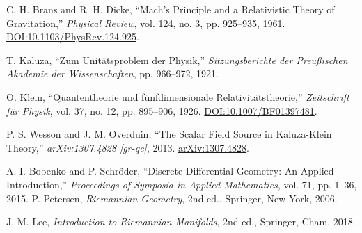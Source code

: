 \documentclass[twoside,twocolumn]{article}
\numberwithin{equation}{section} %
\begin{document}
\begin{thebibliography}{99}
C. H. Brans and R. H. Dicke,
``Mach's Principle and a Relativistic Theory of Gravitation,''
\textit{Physical Review}, vol. 124, no. 3, pp. 925--935, 1961.
\href{https://doi.org/10.1103/PhysRev.124.925}{DOI:10.1103/PhysRev.124.925}.

T. Kaluza,
``Zum Unitätsproblem der Physik,''
\textit{Sitzungsberichte der Preußischen Akademie der Wissenschaften}, pp. 966--972, 1921.

O. Klein,
``Quantentheorie und fünfdimensionale Relativitätstheorie,''
\textit{Zeitschrift für Physik}, vol. 37, no. 12, pp. 895--906, 1926.
\href{https://doi.org/10.1007/BF01397481}{DOI:10.1007/BF01397481}.

P. S. Wesson and J. M. Overduin,
``The Scalar Field Source in Kaluza-Klein Theory,''
\textit{arXiv:1307.4828 [gr-qc]}, 2013.
\href{https://arxiv.org/abs/1307.4828}{arXiv:1307.4828}.

A. I. Bobenko and P. Schr\"oder, %
``Discrete Differential Geometry: An Applied Introduction,''
\textit{Proceedings of Symposia in Applied Mathematics}, vol. 71, pp. 1--36, 2015.
P. Petersen,
\textit{Riemannian Geometry}, 2nd ed.,
Springer, New York, 2006.

J. M. Lee,
\textit{Introduction to Riemannian Manifolds}, 2nd ed.,
Springer, Cham, 2018.



\end{thebibliography}
\end{document}
